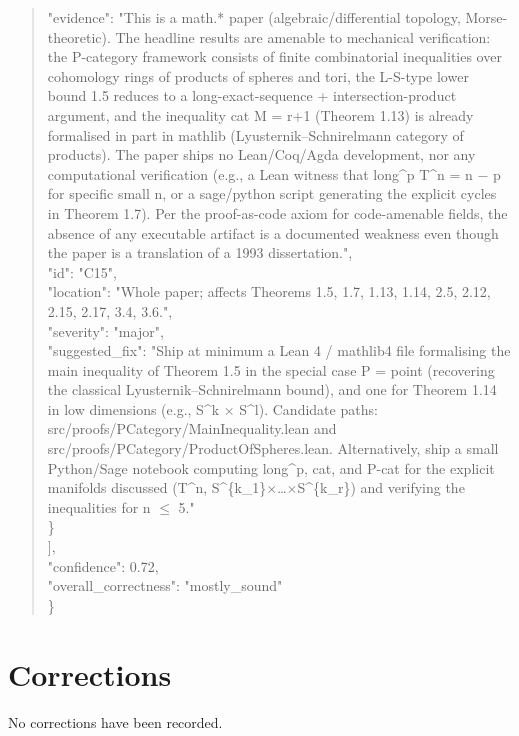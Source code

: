 \documentclass[11pt]{article}
\begin{document}
\begin{quote}
      "evidence": "This is a math.* paper (algebraic/differential topology, Morse-theoretic). The headline results are amenable to mechanical verification: the P-category framework consists of finite combinatorial inequalities over cohomology rings of products of spheres and tori, the L-S-type lower bound 1.5 reduces to a long-exact-sequence + intersection-product argument, and the inequality cat M = r+1 (Theorem 1.13) is already formalised in part in mathlib (Lyusternik--Schnirelmann category of products). The paper ships no Lean/Coq/Agda development, nor any computational verification (e.g., a Lean witness that long\^{}p T\^{}n = n \ensuremath{-} p for specific small n, or a sage/python script generating the explicit cycles in Theorem 1.7). Per the proof-as-code axiom for code-amenable fields, the absence of any executable artifact is a documented weakness even though the paper is a translation of a 1993 dissertation.",\\
      "id": "C15",\\
      "location": "Whole paper; affects Theorems 1.5, 1.7, 1.13, 1.14, 2.5, 2.12, 2.15, 2.17, 3.4, 3.6.",\\
      "severity": "major",\\
      "suggested\_fix": "Ship at minimum a Lean 4 / mathlib4 file formalising the main inequality of Theorem 1.5 in the special case P = point (recovering the classical Lyusternik--Schnirelmann bound), and one for Theorem 1.14 in low dimensions (e.g., S\^{}k \ensuremath{\times} S\^{}l). Candidate paths: src/proofs/PCategory/MainInequality.lean and src/proofs/PCategory/ProductOfSpheres.lean. Alternatively, ship a small Python/Sage notebook computing long\^{}p, cat, and P-cat for the explicit manifolds discussed (T\^{}n, S\^{}\{k\_1\}\ensuremath{\times}…\ensuremath{\times}S\^{}\{k\_r\}) and verifying the inequalities for n \ensuremath{\le} 5."\\
    \}\\
  ],\\
  "confidence": 0.72,\\
  "overall\_correctness": "mostly\_sound"\\
\}\\
\end{quote}

\section*{Corrections}
No corrections have been recorded.
\end{document}
